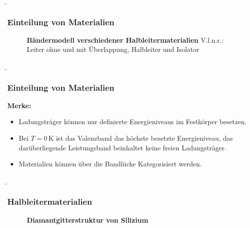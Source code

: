\begin{frame}
    \b{
    \frametitle{Einteilung von Materialien}
    \begin{figure}[H]
        \centering
        
        \caption{\textbf{Bändermodell verschiedener Halbleitermaterialien} V.l.n.r.: Leiter ohne und mit Überlappung, Halbleiter und Isolator}  
    \end{figure}
    }

\end{frame}

\begin{frame}
    \b{
    \frametitle{Einteilung von Materialien}
    \textbf{Merke:}
    \begin{itemize}
        \item Ladungsträger können nur definierte Energieniveaus im Festkörper besetzen.
        \item Bei $T=\mathrm{0\,K}$ ist das Valenzband das höchste besetzte Energieniveau, das darüberliegende Leistungsband beinhaltet keine freien Ladungsträger.
        \item Materialien können über die Bandlücke Kategorisiert werden. 
    \end{itemize}}
\end{frame}


\begin{frame}
    \b{
    \frametitle{Halbleitermaterialien}
    \begin{figure}[H]
        \centering
        
        \caption{\textbf{Diamantgitterstruktur von Silizium}}  
    \end{figure}
    }

\end{frame}

